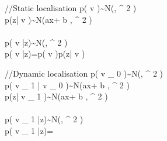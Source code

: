 //Static localisation
p({ v })\quad \sim \quad N(\mu ,{ \sigma  }^{ 2 })\\ p(z|{ v })\quad \sim \quad N(ax+{ b },{ \sigma  }^{ 2 })\\ \\ p({ v }|z)\quad \sim \quad N(\mu ,{ \sigma  }^{ 2 })\\ p({ v }|z)\quad =\quad p({ v })p(z|{ v })

//Dynamic localisation
p({ v }_{ 0 })\quad \sim \quad N(\mu ,{ \sigma  }^{ 2 })\\ p({ v }_{ 1 }|{ v }_{ 0 })\quad \sim \quad N(ax+{ b },{ \sigma  }^{ 2 })\\ p(z|{ v }_{ 1 })\quad \sim \quad N(ax+{ b },{ \sigma  }^{ 2 })\\ \\ p({ v }_{ 1 }|z)\quad \sim \quad N(\mu ,{ \sigma  }^{ 2 })\\ p({ v }_{ 1 }|z)\quad =\quad {} 